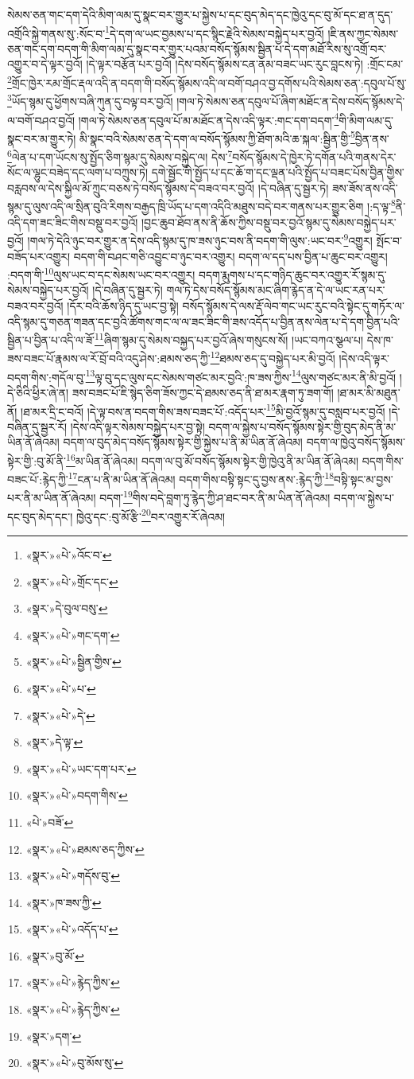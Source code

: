 སེམས་ཅན་གང་དག་དེའི་མིག་ལམ་དུ་སྣང་བར་གྱུར་པ་སྐྱེས་པ་དང་བུད་མེད་དང་ཁྱེའུ་དང་བུ་མོ་དང་ཐ་ན་དུད་འགྲོའི་སྐྱེ་གནས་སུ་:སོང་བ་\footnote{«སྣར་»«པེ་»འོང་བ་}དེ་དག་ལ་ཡང་བྱམས་པ་དང་སྙིང་རྗེའི་སེམས་བསྐྱེད་པར་བྱའོ། །ཇི་ནས་ཀྱང་སེམས་ཅན་གང་དག་བདག་གི་མིག་ལམ་དུ་སྣང་བར་གྱུར་པའམ་བསོད་སྙོམས་སྦྱིན་པ་དེ་དག་མཐོ་རིས་སུ་འགྲོ་བར་འགྱུར་བ་དེ་ལྟར་བྱའོ། །དེ་ལྟར་བརྩོན་པར་བྱའོ། །དེས་བསོད་སྙོམས་ངན་ནམ་བཟང་ཡང་རུང་བླངས་ཏེ། :གྲོང་ངམ་\footnote{«སྣར་»«པེ་»གྲོང་དང་}གྲོང་ཁྱེར་རམ་གྲོང་རྡལ་འདི་ན་བདག་གི་བསོད་སྙོམས་འདི་ལ་བགོ་བཤའ་བྱ་དགོས་པའི་སེམས་ཅན་:དབུལ་པོ་སུ་\footnote{«སྣར་»དེ་བུལ་བསུ་}ཡོད་སྙམ་དུ་ཕྱོགས་བཞི་ཀུན་དུ་བལྟ་བར་བྱའོ། །གལ་ཏེ་སེམས་ཅན་དབུལ་པོ་ཞིག་མཐོང་ན་དེས་བསོད་སྙོམས་དེ་ལ་བགོ་བཤའ་བྱའོ། །གལ་ཏེ་སེམས་ཅན་དབུལ་པོ་མ་མཐོང་ན་དེས་འདི་ལྟར་:གང་དག་བདག་\footnote{«སྣར་»«པེ་»གང་དག་}གི་མིག་ལམ་དུ་སྣང་བར་མ་གྱུར་ཏེ། མི་སྣང་བའི་སེམས་ཅན་དེ་དག་ལ་བསོད་སྙོམས་ཀྱི་ཐོག་མའི་ཆ་སྐལ་:སྦྱིན་གྱི་\footnote{«སྣར་»«པེ་»སྦྱིན་གྱིས་}བྱིན་ནས་\footnote{«སྣར་»«པེ་»པ་}ལེན་པ་དག་ཡོངས་སུ་སྤྱོད་ཅིག་སྙམ་དུ་སེམས་བསྐྱེད་ལ། དེས་\footnote{«སྣར་»«པེ་»དེ་}བསོད་སྙོམས་དེ་ཁྱེར་ཏེ་དགོན་པའི་གནས་དེར་སོང་ལ་ལྷུང་བཟེད་དང་ལག་པ་བཀྲུས་ཏེ། དགེ་སྦྱོང་གི་སྤྱོད་པ་དང་ཆོ་ག་དང་ལྡན་པའི་སྤྱོད་པ་བཟང་པོས་བྱིན་གྱིས་བརླབས་ལ་དེས་སྐྱིལ་མོ་ཀྲུང་བཅས་ཏེ་བསོད་སྙོམས་དེ་བཟའ་བར་བྱའོ། །དེ་བཞིན་དུ་སྦྱར་ཏེ། ཟས་ཟོས་ནས་འདི་སྙམ་དུ་ལུས་འདི་ལ་སྲིན་བུའི་རིགས་བརྒྱད་ཁྲི་ཡོད་པ་དག་འདིའི་མཐུས་བདེ་བར་གནས་པར་གྱུར་ཅིག །:ད་ལྟ་\footnote{«སྣར་»དེ་ལྟ་}ནི་འདི་དག་ཟང་ཟིང་གིས་བསྡུ་བར་བྱའོ། །བྱང་ཆུབ་ཐོབ་ནས་ནི་ཆོས་ཀྱིས་བསྡུ་བར་བྱའོ་སྙམ་དུ་སེམས་བསྐྱེད་པར་བྱའོ། །གལ་ཏེ་དེའི་ཉུང་བར་གྱུར་ན་དེས་འདི་སྙམ་དུ་ཁ་ཟས་ཉུང་བས་ནི་བདག་གི་ལུས་:ཡང་བར་\footnote{«སྣར་»«པེ་»ཡང་དག་པར་}འགྱུར། སྤོང་བ་བཟོད་པར་འགྱུར། བདག་གི་བཤང་གཅི་འབྱུང་བ་ཉུང་བར་འགྱུར། བདག་ལ་དད་པས་བྱིན་པ་ཆུང་བར་འགྱུར། :བདག་གི་\footnote{«སྣར་»«པེ་»བདག་གིས་}ལུས་ཡང་བ་དང་སེམས་ཡང་བར་འགྱུར། བདག་རྨུགས་པ་དང་གཉིད་ཆུང་བར་འགྱུར་རོ་སྙམ་དུ་སེམས་བསྐྱེད་པར་བྱའོ། །དེ་བཞིན་དུ་སྦྱར་ཏེ། གལ་ཏེ་དེས་བསོད་སྙོམས་མང་ཞིག་རྙེད་ན་དེ་ལ་ཡང་རན་པར་བཟའ་བར་བྱའོ། །དོར་བའི་ཆོས་ཉིད་དུ་ཡང་བྱ་སྟེ། བསོད་སྙོམས་དེ་ལས་རྡོ་ལེབ་གང་ཡང་རུང་བའི་སྟེང་དུ་གཏོར་ལ་འདི་སྙམ་དུ་གཅན་གཟན་དང་བྱའི་ཚོགས་གང་ལ་ལ་ཟང་ཟིང་གི་ཟས་འདོད་པ་བྱིན་ནས་ལེན་པ་དེ་དག་བྱིན་པའི་སྦྱིན་པ་བྱིན་པ་འདི་ལ་ཟོ་\footnote{«པེ་»བཟོ་}ཞིག་སྙམ་དུ་སེམས་བསྐྱད་པར་བྱའོ་ཞེས་གསུངས་སོ། །ཡང་བཀའ་སྩལ་པ། དེས་ཁ་ཟས་བཟང་པོ་རྣམས་ལ་རོ་བྲོ་བའི་འདུ་ཤེས་:ཐམས་ཅད་ཀྱི་\footnote{«སྣར་»«པེ་»ཐམས་ཅད་ཀྱིས་}ཐམས་ཅད་དུ་བསྐྱེད་པར་མི་བྱའོ། །དེས་འདི་ལྟར་བདག་གིས་:གདོལ་བུ་\footnote{«སྣར་»«པེ་»གདོས་བུ་}ལྟ་བུ་དང་ལུས་དང་སེམས་གཙང་མར་བྱའི་:ཁ་ཟས་ཀྱིས་\footnote{«སྣར་»ཁ་ཟས་ཀྱི་}ལུས་གཙང་མར་ནི་མི་བྱའོ། །དེ་ཅིའི་ཕྱིར་ཞེ་ན། ཟས་བཟང་པོ་ཇི་སྙེད་ཅིག་ཟོས་ཀྱང་དེ་ཐམས་ཅད་ནི་ཐ་མར་རྣག་ཏུ་ཟག་གོ། །ཐ་མར་མི་མཐུན་ནོ། །ཐ་མར་དྲི་ང་བའོ། །དེ་ལྟ་བས་ན་བདག་གིས་ཟས་བཟང་པོ་:འདོད་པར་\footnote{«སྣར་»«པེ་»འདོད་པ་}མི་བྱའོ་སྙམ་དུ་བསླབ་པར་བྱའོ། །དེ་བཞིན་དུ་སྦྱར་རོ། །དེས་འདི་ལྟར་སེམས་བསྐྱེད་པར་བྱ་སྟེ། བདག་ལ་སྐྱེས་པ་བསོད་སྙོམས་སྟེར་གྱི་བུད་མེད་ནི་མ་ཡིན་ནོ་ཞེའམ། བདག་ལ་བུད་མེད་བསོད་སྙོམས་སྟེར་གྱི་སྐྱེས་པ་ནི་མ་ཡིན་ནོ་ཞེའམ། བདག་ལ་ཁྱེའུ་བསོད་སྙོམས་སྟེར་གྱི་:བུ་མོ་ནི་\footnote{«སྣར་»བུ་མོ་}མ་ཡིན་ནོ་ཞེའམ། བདག་ལ་བུ་མོ་བསོད་སྙོམས་སྟེར་གྱི་ཁྱེའུ་ནི་མ་ཡིན་ནོ་ཞེའམ། བདག་གིས་བཟང་པོ་:རྙེད་ཀྱི་\footnote{«སྣར་»«པེ་»རྙེད་ཀྱིས་}ངན་པ་ནི་མ་ཡིན་ནོ་ཞེའམ། བདག་གིས་བསྟི་སྟང་དུ་བྱས་ནས་:རྙེད་ཀྱི་\footnote{«སྣར་»«པེ་»རྙེད་ཀྱིས་}བསྟི་སྟང་མ་བྱས་པར་ནི་མ་ཡིན་ནོ་ཞེའམ། བདག་\footnote{«སྣར་»དག་}གིས་བདེ་བླག་ཏུ་རྙེད་ཀྱི་ཤ་ཐང་བར་ནི་མ་ཡིན་ནོ་ཞེའམ། བདག་ལ་སྐྱེས་པ་དང་བུད་མེད་དང་། ཁྱེའུ་དང་:བུ་མོ་རྩི་\footnote{«སྣར་»«པེ་»བུ་མོས་སུ་}བར་འགྱུར་རོ་ཞེའམ། 